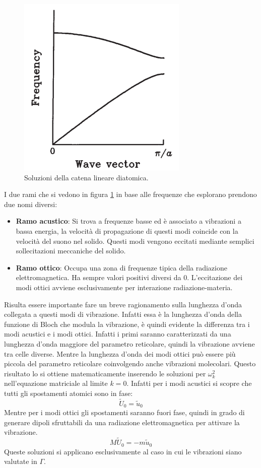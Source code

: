 \documentclass[oneside]{amsbook}
\numberwithin{section}{chapter}
\numberwithin{equation}{section}
\numberwithin{figure}{section}
\begin{document}
\begin{figure}[H]
\centering
\caption{Soluzioni della catena lineare diatomica.}\label{AA2}
\includegraphics[scale=0.5]{AA2}
\end{figure}
I due rami che si vedono in figura \ref{AA2} in base alle frequenze che esplorano prendono due nomi diversi:
\begin{itemize}
\item \textbf{Ramo acustico}: Si trova a frequenze basse ed è associato a vibrazioni a bassa energia, la velocità di propagazione di questi modi coincide con la velocità del suono nel solido. Questi modi vengono eccitati mediante semplici sollecitazioni meccaniche del solido.
\item \textbf{Ramo ottico}: Occupa una zona di frequenze tipica della radiazione elettromagnetica. Ha sempre valori positivi diversi da $0$. L'eccitazione dei modi ottici avviene esclusivamente per interazione radiazione-materia.
\end{itemize}
Risulta essere importante fare un breve ragionamento sulla lunghezza d'onda collegata a questi modi di vibrazione. Infatti essa è la lunghezza d'onda della funzione di Bloch che modula la vibrazione, è quindi evidente la differenza tra i modi acustici e i modi ottici. Infatti i primi saranno caratterizzati da una lunghezza d'onda maggiore del parametro reticolare, quindi la vibrazione avviene tra celle diverse. Mentre la lunghezza d'onda dei modi ottici può essere più piccola del parametro reticolare coinvolgendo anche vibrazioni molecolari. Questo risultato lo si ottiene matematicamente inserendo le soluzioni per $\omega_k^2$ nell'equazione matriciale al limite $k=0$. Infatti per i modi acustici si scopre che tutti gli spostamenti atomici sono in fase:
\begin{equation}
\tilde{U}_0=\tilde{u}_0
\end{equation}
Mentre per i modi ottici gli spostamenti saranno fuori fase, quindi in grado di generare dipoli sfruttabili da una radiazione elettromagnetica per attivare la vibrazione.
\begin{equation}
M\tilde{U}_0=-m\tilde{u}_0
\end{equation}
Queste soluzioni si applicano esclusivamente al caso in cui le vibrazioni siano valutate in $\Gamma$.
\end{document}
